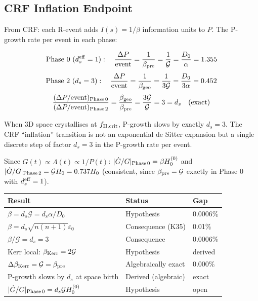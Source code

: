 \documentclass[12pt, a4paper]{article}
\begin{document}
\subsection{CRF Inflation Endpoint}

\begin{derivedbox}[title={P-Growth Slows by Exactly $d_s = 3$ at Space Birth}]
From CRF: each R-event adds $I(s) = 1/\beta$ information units to $P$.
The P-growth rate per event in each phase:

\[
  \text{Phase 0 }(d_s^{\rm eff}=1):\quad
  \frac{\Delta P}{\rm event} = \frac{1}{\beta_{\rm pre}} = \frac{1}{\mathcal{G}} = \frac{D_0}{\alpha} = 1.355
\]
\[
  \text{Phase 2 }(d_s=3):\quad
  \frac{\Delta P}{\rm event} = \frac{1}{\beta_{\rm geo}} = \frac{1}{3\mathcal{G}} = \frac{D_0}{3\alpha} = 0.452
\]
\[
  \frac{(\Delta P/\rm event)_{\rm Phase\,0}}{(\Delta P/\rm event)_{\rm Phase\,2}}
  = \frac{\beta_{\rm geo}}{\beta_{\rm pre}} = \frac{3\mathcal{G}}{\mathcal{G}} = 3 = d_s \quad \text{(exact)}
\]

When 3D space crystallises at $f_{\rm II,crit}$, P-growth slows by exactly $d_s = 3$.
The CRF ``inflation'' transition is not an exponential de Sitter expansion but a
single discrete step of factor $d_s = 3$ in the P-growth rate per event.

Since $G(t)\propto\Lambda(t)\propto 1/P(t)$: $|\dot{G}/G|_{\rm Phase\,0} = \beta H_0^{(0)}$
and $|\dot{G}/G|_{\rm Phase\,2} = \mathcal{G}H_0 = 0.737H_0$ (consistent, since
$\beta_{\rm pre} = \mathcal{G}$ exactly in Phase 0 with $d_s^{\rm eff}=1$).
\end{derivedbox}

\begin{center}
\renewcommand{\arraystretch}{1.3}
\begin{tabular}{p{5cm} p{2.8cm} p{1.8cm}}
\toprule
\textbf{Result} & \textbf{Status} & \textbf{Gap} \\
\midrule
$\beta = d_s\mathcal{G} = d_s\alpha/D_0$ & Hypothesis & 0.0006\% \\
$\beta = d_s\sqrt{n(n+1)}\varepsilon_0$ & Consequence (K35) & 0.01\% \\
$\beta/\mathcal{G} = d_s = 3$ & Consequence & 0.0006\% \\
Kerr local: $\beta_{\rm Kerr} = 2\mathcal{G}$ & Hypothesis & derived \\
$\Delta\beta_{\rm Kerr} = \mathcal{G} = \beta_{\rm pre}$ & Algebraically exact & 0.000\% \\
P-growth slows by $d_s$ at space birth & Derived (algebraic) & exact \\
$|\dot{G}/G|_{\rm Phase\,0} = d_s\mathcal{G}H_0^{(0)}$ & Hypothesis & open \\
\bottomrule
\end{tabular}
\end{center}
\end{document}
